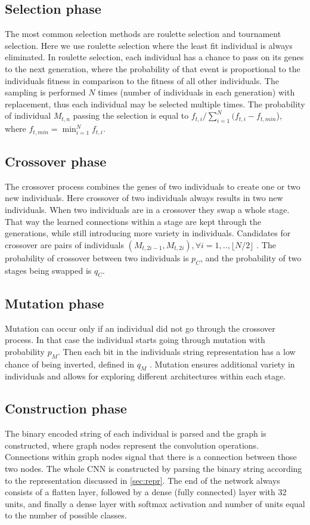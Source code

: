 \documentclass[eng]{simposium}
\begin{document}
\subsection{Selection phase} 
The most common selection methods are roulette selection and tournament selection.  
Here we use roulette selection where the least fit individual is always eliminated. 
In roulette selection, each individual has a chance to pass on its genes to the next generation,  
where the probability of that event is proportional to the individuals fitness in comparison to the fitness of all other individuals. 
The sampling is performed $N$ times (number of individuals in each generation) with replacement, thus each individual may be selected multiple times. 
The probability of individual $M_{t,n}$ passing the selection is equal to $f_{t,i} / \sum_{i=1}^{N} (f_{t,i} - f_{t,min}$), where $f_{t, min} = \min_{i=1}^{N} {f_{t,i}}$. 

\subsection{Crossover phase} 

The crossover process combines the genes of two individuals to create one or two new individuals. 
Here crossover of two individuals always results in two new individuals. 
When two individuals are in a crossover they swap a whole stage. 
That way the learned connections within a stage are kept through the generations, while still introducing more variety in individuals. 
Candidates for crossover are pairs of individuals $(M_{t,2i-1}, M_{t,2i}), \forall i=1,..,\lfloor N/2\rfloor $ \cite{4}. 
The probability of crossover between two individuals is $p_C$, and the probability of two stages being swapped is $q_C$. 

\subsection{Mutation phase} 
Mutation can occur only if an individual did not go through the crossover process. 
In that case the individual starts going through mutation with probability $p_M$. 
Then each bit in the individuals string representation has a low chance of being inverted, defined in $q_M$ \cite{4}. 
Mutation ensures additional variety in individuals and allows for exploring different architectures within each stage. 

\subsection{Construction phase} 
The binary encoded  string of each individual is parsed and the graph is constructed, where graph nodes represent the convolution operations. 
Connections within graph nodes signal that there is a connection between those two nodes. 
The whole CNN is constructed by parsing the binary string according to the representation discussed in \ref{sec:repr}.  
The end of the network always consists of a flatten layer, followed by a dense (fully connected) layer with 32 units, and finally a dense  
layer with softmax activation and number of units equal to the number of possible classes. 
\end{document}
